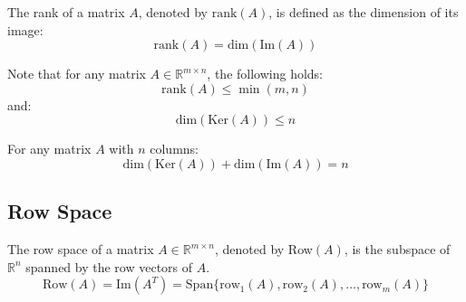 \begin{definition}[Rank]
    The rank of a matrix $A$, denoted by $\text{rank}(A)$, is defined as the dimension of its image:
    \[ \text{rank}(A) = \text{dim}(\text{Im}(A)) \]
\end{definition}
Note that for any matrix $A \in \mathbb{R}^{m \times n}$, the following holds:
\[ \text{rank}(A) \leq \min(m, n) \]
and:
\[ \text{dim}(\text{Ker}(A)) \leq n \]

\begin{theorem}
    For any matrix $A$ with $n$ columns:
    \[ \text{dim}(\text{Ker}(A)) + \text{dim}(\text{Im}(A)) = n \]
\end{theorem}

\subsection{Row Space}
\begin{definition}
    The row space of a matrix $A \in \mathbb{R}^{m \times n}$, denoted by Row$(A)$, is the subspace of $\mathbb{R}^n$ spanned by the row vectors of $A$.
    \[
        \text{Row}(A) = \text{Im}(A^T) = \text{Span}\{\text{row}_1(A), \text{row}_2(A), \ldots, \text{row}_m(A)\}
    \]
\end{definition}

